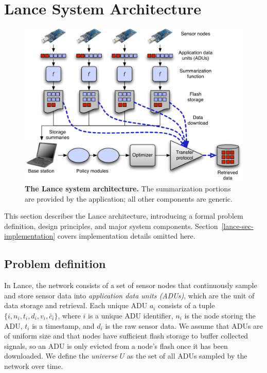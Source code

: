 \section{Lance System Architecture}
\label{lance-sec-architecture}

\begin{figure}[t]
\label{lance-fig-architecture}
\begin{center}
\includegraphics[width=1.0\hsize]{./4-lance/figs/new-arch.pdf}
\end{center}
\caption{\textbf{The Lance system architecture.}
The summarization portions are provided by the application; all other
components are generic.}
\end{figure}

This section describes the Lance architecture, introducing a
formal problem definition, design principles, and major system components.
Section~\ref{lance-sec-implementation} covers implementation details omitted here.

\subsection{Problem definition}
\label{lance-sec-problem-definition}

In Lance, the network consists of a set of sensor nodes that continuously
sample and store sensor data into {\em application data units (ADUs)}, which
are the unit of data storage and retrieval.  Each unique ADU $a_i$ consists
of a tuple $\{ i, n_i, t_i, d_i, v_i, \bar{c}_i \}$, 
where $i$ is a unique ADU identifier,
$n_i$ is the node storing the ADU, $t_i$ is a timestamp, and $d_i$ is the raw
sensor data.  We assume that ADUs are of uniform size and that nodes 
have sufficient flash storage to buffer collected signals, so an 
ADU is only evicted from a node's flash once it has been downloaded.
We define the {\em universe} $U$ as the set of all ADUs sampled by the 
network over time. 

